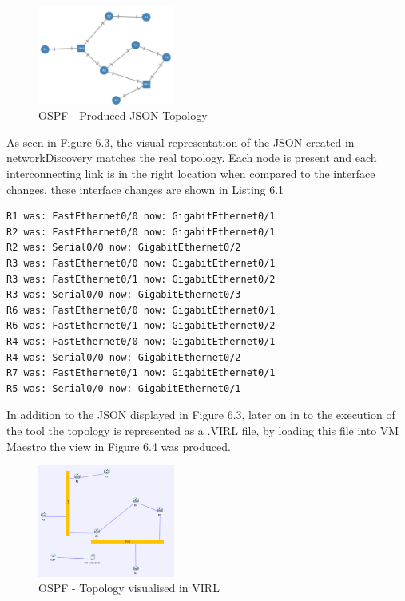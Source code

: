 \documentclass[11pt]{report}
\begin{document}
\begin{figure}[h!]
	\caption{OSPF - Produced JSON Topology}
	\centering
	\begin{center}
		\includegraphics[width=0.4\textwidth]{OSPF-Web.png}
	\end{center}
\end{figure}

As seen in Figure 6.3, the visual representation of the JSON created in networkDiscovery matches the real topology. Each node is present and each interconnecting link is in the right location when compared to the interface changes, these interface changes are shown in Listing 6.1

\begin{lstlisting}[caption=Interface mappings for OSPF topology]
R1 was: FastEthernet0/0 now: GigabitEthernet0/1
R2 was: FastEthernet0/0 now: GigabitEthernet0/1
R2 was: Serial0/0 now: GigabitEthernet0/2
R3 was: FastEthernet0/0 now: GigabitEthernet0/1
R3 was: FastEthernet0/1 now: GigabitEthernet0/2
R3 was: Serial0/0 now: GigabitEthernet0/3
R6 was: FastEthernet0/0 now: GigabitEthernet0/1
R6 was: FastEthernet0/1 now: GigabitEthernet0/2
R4 was: FastEthernet0/0 now: GigabitEthernet0/1
R4 was: Serial0/0 now: GigabitEthernet0/2
R7 was: FastEthernet0/1 now: GigabitEthernet0/1
R5 was: Serial0/0 now: GigabitEthernet0/1
\end{lstlisting}

In addition to the JSON displayed in Figure 6.3, later on in to the execution of the tool the topology is represented as a .VIRL file, by loading this file into VM Maestro the view in Figure 6.4 was produced.

\FloatBarrier
\begin{figure}[h!]
	\caption{OSPF - Topology visualised in VIRL}
	\centering
	\begin{center}
		\includegraphics[width=0.4\textwidth]{OSPF-VIRL.png}
	\end{center}
\end{figure}
\FloatBarrier
\end{document}

